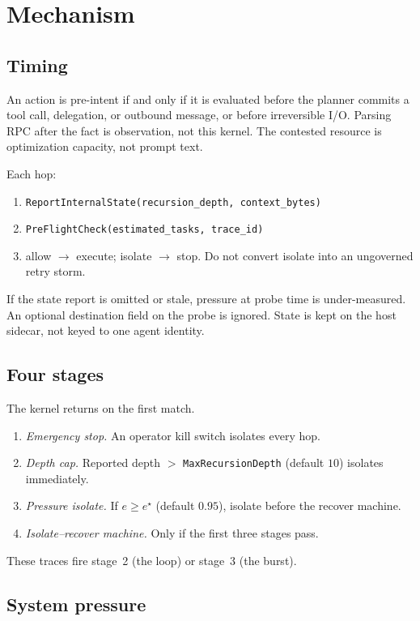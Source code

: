\documentclass[11pt,a4paper]{article}
\begin{document}
\section{Mechanism}

\subsection{Timing}

An action is pre-intent if and only if it is evaluated before the planner commits a tool call, delegation, or outbound message, or before irreversible I/O.
Parsing RPC after the fact is observation, not this kernel.
The contested resource is optimization capacity, not prompt text.

Each hop:
\begin{enumerate}
  \item \texttt{ReportInternalState(recursion\_depth, context\_bytes)}
  \item \texttt{PreFlightCheck(estimated\_tasks, trace\_id)}
  \item allow $\to$ execute; isolate $\to$ stop. Do not convert isolate into an ungoverned retry storm.
\end{enumerate}

If the state report is omitted or stale, pressure at probe time is under-measured.
An optional destination field on the probe is ignored.
State is kept on the host sidecar, not keyed to one agent identity.

\subsection{Four stages}

The kernel returns on the first match.
\begin{enumerate}
  \item \emph{Emergency stop.} An operator kill switch isolates every hop.
  \item \emph{Depth cap.} Reported depth $>$ \texttt{MaxRecursionDepth} (default $10$) isolates immediately.
  \item \emph{Pressure isolate.} If $e \ge e^{\star}$ (default $0.95$), isolate before the recover machine.
  \item \emph{Isolate--recover machine.} Only if the first three stages pass.
\end{enumerate}

These traces fire stage~2 (the loop) or stage~3 (the burst).

\subsection{System pressure}
\end{document}
